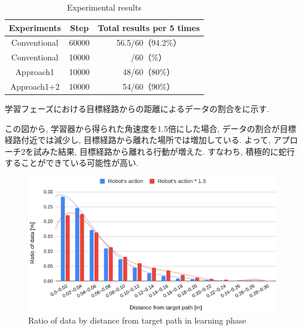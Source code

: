 \begin{itemize}

  \begin{table}[hbtp]
    \caption{Experimental results}
    \label{table:result4}
    \centering
    \begin{tabular}{|c|c|c|}
      \hline
      Experiments & Step & Total results per 5 times\\
      \hline
      Conventional & 60000 & 56.5/60（94.2\%）\\
      \hline
      Conventional & 10000 & /60（\%）\\
      \hline
      Approach1 & 10000 & 48/60（80\%）\\
      \hline
      Approach1+2 & 10000 & 54/60（90\%）\\
      \hline
    \end{tabular}
  \end{table}

  \vspace{1cm}

  学習フェーズにおける目標経路からの距離によるデータの割合をに示す. \par
  この図から, 学習器から得られた角速度を1.5倍にした場合, データの割合が目標経路付近では減少し, 目標経路から離れた場所では増加している. よって, アプローチ2を試みた結果, 目標経路から離れる行動が増えた. すなわち, 積極的に蛇行することができている可能性が高い.

  \vspace{1cm}

  \begin{figure}[hbtp]
    \centering
   \includegraphics[keepaspectratio, scale=0.55]
        {images/hist_act_training.png}
   \caption{Ratio of data by distance from target path in learning phase}
   \label{Fig:hist_act_training}
  \end{figure}  


\end{itemize}
